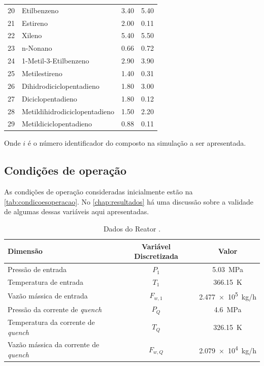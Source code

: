 \begin{table}[!htb]
\begin{center}
\begin{tabular}{clcc}
20& Etilbenzeno				& \num{3,40} & \num{5,40} \\
21& Estireno				& \num{2,00} & \num{0,11} \\
22& Xileno					& \num{5,40} & \num{5,50} \\
23& n-Nonano				& \num{0,66} & \num{0,72} \\
24& 1-Metil-3-Etilbenzeno	& \num{2,90} & \num{3,90} \\
25& Metilestireno			& \num{1,40} & \num{0,31} \\
26& Dihidrodiciclopentadieno	& \num{1,80} & \num{3,00} \\
27& Diciclopentadieno		& \num{1,80} & \num{0,12} \\
28& Metildihidrodiciclopentadieno	& \num{1,50} & \num{2,20} \\
29& Metildiciclopentadieno	& \num{0,88} & \num{0,11} \\
\bottomrule
\end{tabular}
\end{center}
Onde $i$ é o número identificador do composto na simulação a ser apresentada.
\end{table}


\subsection{Condições de operação} \label{sec:condicaocomposicaocorrentes}

As condições de operação consideradas inicialmente estão na
\autoref{tab:condicoesoperacao}. No \autoref{chap:resultados} há uma discussão
sobre a validade de algumas dessas variáveis aqui apresentadas.

\begin{table}[!htb]
\begin{center}
\caption{Dados do Reator \cite{Rojas2014a}.}
\label{tab:condicoesoperacao}
\small
\begin{tabular}{lcc}
{Dimensão} & {Variável Discretizada} & {Valor}
\\
\hline
{Pressão de entrada} & {$P_{1}$} & \SI{5,03}{MPa} \\
{Temperatura de entrada} & {$T_{1}$} & \SI{366,15}{K} \\
{Vazão mássica de entrada} & {$F_{w,1}$} & \SI{2,477e5}{kg/h} \\
{Pressão da corrente de \emph{quench}} & {$P_{Q}$} & \SI{4,6}{MPa} \\
{Temperatura da corrente de \emph{quench}} & {$T_{Q}$} & \SI{326,15}{K} \\
{Vazão mássica da corrente de \emph{quench}} & {$F_{w,Q}$} & \SI{2,079e4}{kg/h}
\\
\bottomrule
\end{tabular}
\end{center}
\end{table}

